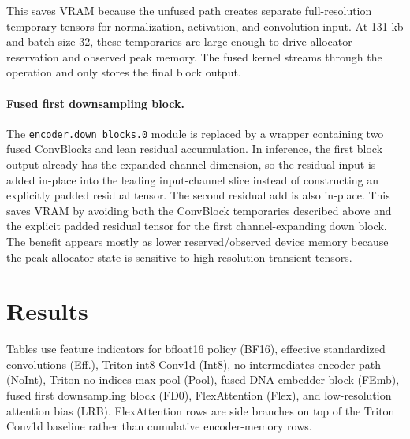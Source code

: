 \documentclass[11pt]{article}
\begin{document}
This saves VRAM because the unfused path creates separate full-resolution
temporary tensors for normalization, activation, and convolution input. At
131 kb and batch size 32, these temporaries are large enough to drive allocator
reservation and observed peak memory. The fused kernel streams through the
operation and only stores the final block output.

\paragraph{Fused first downsampling block.}
The \texttt{encoder.down\_blocks.0} module is replaced by a wrapper containing
two fused ConvBlocks and lean residual accumulation. In inference, the first
block output already has the expanded channel dimension, so the residual input
is added in-place into the leading input-channel slice instead of constructing
an explicitly padded residual tensor. The second residual add is also in-place.
This saves VRAM by avoiding both the ConvBlock temporaries described above and
the explicit padded residual tensor for the first channel-expanding down block.
The benefit appears mostly as lower reserved/observed device memory because the
peak allocator state is sensitive to high-resolution transient tensors.

\section{Results}

Tables use feature indicators for bfloat16 policy (BF16), effective
standardized convolutions (Eff.), Triton int8 Conv1d (Int8), no-intermediates
encoder path (NoInt), Triton no-indices max-pool (Pool), fused DNA embedder
block (FEmb), fused first downsampling block (FD0), FlexAttention (Flex), and
low-resolution attention bias (LRB). FlexAttention rows are side branches on top
of the Triton Conv1d baseline rather than cumulative encoder-memory rows.
\end{document}
